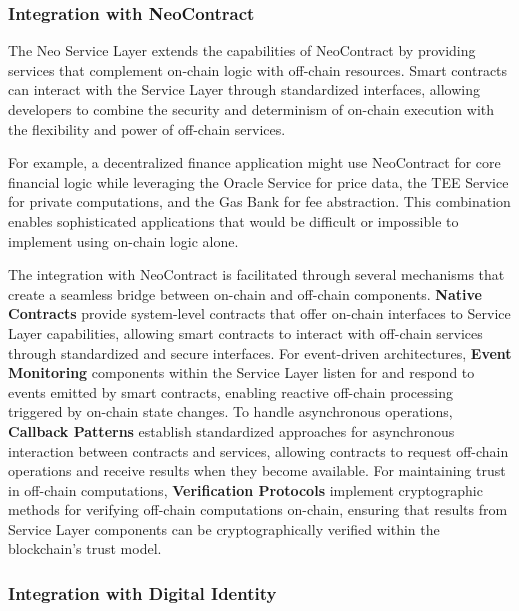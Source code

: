 \documentclass[11pt]{article}
\begin{document}


\subsubsection{Integration with NeoContract}
\label{subsubsec:neocontract-integration}

The Neo Service Layer extends the capabilities of NeoContract by providing services that complement on-chain logic with off-chain resources. Smart contracts can interact with the Service Layer through standardized interfaces, allowing developers to combine the security and determinism of on-chain execution with the flexibility and power of off-chain services.

For example, a decentralized finance application might use NeoContract for core financial logic while leveraging the Oracle Service for price data, the TEE Service for private computations, and the Gas Bank for fee abstraction. This combination enables sophisticated applications that would be difficult or impossible to implement using on-chain logic alone.

The integration with NeoContract is facilitated through several mechanisms that create a seamless bridge between on-chain and off-chain components. \textbf{Native Contracts} provide system-level contracts that offer on-chain interfaces to Service Layer capabilities, allowing smart contracts to interact with off-chain services through standardized and secure interfaces. For event-driven architectures, \textbf{Event Monitoring} components within the Service Layer listen for and respond to events emitted by smart contracts, enabling reactive off-chain processing triggered by on-chain state changes. To handle asynchronous operations, \textbf{Callback Patterns} establish standardized approaches for asynchronous interaction between contracts and services, allowing contracts to request off-chain operations and receive results when they become available. For maintaining trust in off-chain computations, \textbf{Verification Protocols} implement cryptographic methods for verifying off-chain computations on-chain, ensuring that results from Service Layer components can be cryptographically verified within the blockchain's trust model.

\subsubsection{Integration with Digital Identity}
\label{subsubsec:identity-integration}
\end{document}

